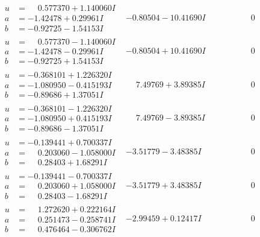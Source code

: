 \documentclass[1p]{elsarticle_modified}
\theoremstyle{definition}
\begin{document}
$$\begin{array}{c|c|c}
\begin{aligned}
u &= \phantom{-}0.577370 + 1.140060 I \\
a &= -1.42478 + 0.29961 I \\
b &= -0.92725 - 1.54153 I\end{aligned}
 & -0.80504 - 10.41690 I & \phantom{-0.000000 } 0 \\ \hline\begin{aligned}
u &= \phantom{-}0.577370 - 1.140060 I \\
a &= -1.42478 - 0.29961 I \\
b &= -0.92725 + 1.54153 I\end{aligned}
 & -0.80504 + 10.41690 I & \phantom{-0.000000 } 0 \\ \hline\begin{aligned}
u &= -0.368101 + 1.226320 I \\
a &= -1.080950 - 0.415193 I \\
b &= -0.89686 + 1.37051 I\end{aligned}
 & \phantom{-}7.49769 + 3.89385 I & \phantom{-0.000000 } 0 \\ \hline\begin{aligned}
u &= -0.368101 - 1.226320 I \\
a &= -1.080950 + 0.415193 I \\
b &= -0.89686 - 1.37051 I\end{aligned}
 & \phantom{-}7.49769 - 3.89385 I & \phantom{-0.000000 } 0 \\ \hline\begin{aligned}
u &= -0.139441 + 0.700337 I \\
a &= \phantom{-}0.203060 - 1.058000 I \\
b &= \phantom{-}0.28403 + 1.68291 I\end{aligned}
 & -3.51779 - 3.48385 I & \phantom{-0.000000 } 0 \\ \hline\begin{aligned}
u &= -0.139441 - 0.700337 I \\
a &= \phantom{-}0.203060 + 1.058000 I \\
b &= \phantom{-}0.28403 - 1.68291 I\end{aligned}
 & -3.51779 + 3.48385 I & \phantom{-0.000000 } 0 \\ \hline\begin{aligned}
u &= \phantom{-}1.272620 + 0.222164 I \\
a &= \phantom{-}0.251473 - 0.258741 I \\
b &= \phantom{-}0.476464 - 0.306762 I\end{aligned}
 & -2.99459 + 0.12417 I & \phantom{-0.000000 } 0 \\ \hline\begin{aligned}

\end{aligned}
\end{array}$$
\end{document}
